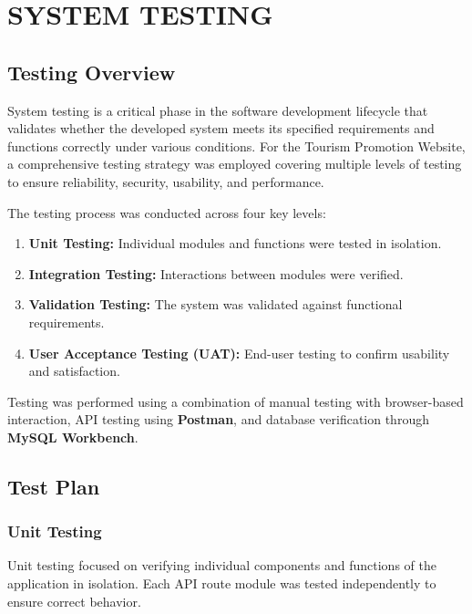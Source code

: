 \chapter{SYSTEM TESTING}

\section{Testing Overview}

System testing is a critical phase in the software development lifecycle that validates whether the developed system meets its specified requirements and functions correctly under various conditions. For the Tourism Promotion Website, a comprehensive testing strategy was employed covering multiple levels of testing to ensure reliability, security, usability, and performance.

The testing process was conducted across four key levels:
\begin{enumerate}[leftmargin=2em]
    \item \textbf{Unit Testing:} Individual modules and functions were tested in isolation.
    \item \textbf{Integration Testing:} Interactions between modules were verified.
    \item \textbf{Validation Testing:} The system was validated against functional requirements.
    \item \textbf{User Acceptance Testing (UAT):} End-user testing to confirm usability and satisfaction.
\end{enumerate}

Testing was performed using a combination of manual testing with browser-based interaction, API testing using \textbf{Postman}, and database verification through \textbf{MySQL Workbench}.

\section{Test Plan}

\subsection{Unit Testing}

Unit testing focused on verifying individual components and functions of the application in isolation. Each API route module was tested independently to ensure correct behavior.

